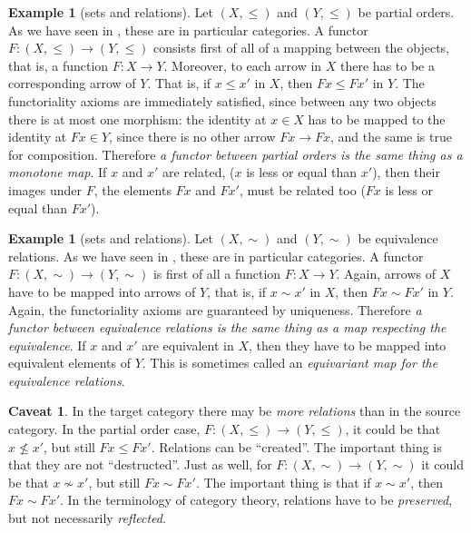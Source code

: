 \documentclass[a4paper,11pt,oneside]{scrbook}
\numberwithin{equation}{section}
\theoremstyle{plain}
\theoremstyle{definition}
\newtheorem{eg}[thm]{Example}
\newtheorem*{caveat}{Caveat}
\DeclareMathOperator{\1}{\mathbbm{1}}
\DeclareMathOperator{\2}{\mathbbm{2}}
\begin{document}
\begin{eg}[sets and relations]
 Let $(X,\le)$ and $(Y,\le)$ be partial orders. As we have seen in , these are in particular categories. A functor $F:(X,\le)\to (Y,\le)$ consists first of all of a mapping between the objects, that is, a function $F:X\to Y$. Moreover, to each arrow in $X$ there has to be a corresponding arrow of $Y$. That is, if $x\le x'$ in $X$, then $Fx \le Fx'$ in $Y$. The functoriality axioms are immediately satisfied, since between any two objects there is at most one morphism: the identity at $x\in X$ has to be mapped to the identity at $Fx\in Y$, since there is no other arrow $Fx\to Fx$, and the same is true for composition. 
 Therefore \emph{a functor between partial orders is the same thing as a monotone map}. If $x$ and $x'$ are related, ($x$ is less or equal than $x'$), then their images under $F$, the elements $Fx$ and $Fx'$, must be related too ($Fx$ is less or equal than $Fx'$). 
\end{eg}

\begin{eg}[sets and relations]\label{equequ}
 Let $(X,\sim)$ and $(Y,\sim)$ be equivalence relations. As we have seen in , these are in particular categories. A functor $F:(X,\sim)\to(Y,\sim)$ is first of all a function $F:X\to Y$. Again, arrows of $X$ have to be mapped into arrows of $Y$, that is, if $x\sim x'$ in $X$, then $Fx \sim Fx'$ in $Y$. Again, the functoriality axioms are guaranteed by uniqueness.
 Therefore \emph{a functor between equivalence relations is the same thing as a map respecting the equivalence}.
 If $x$ and $x'$ are equivalent in $X$, then they have to be mapped into equivalent elements of $Y$. This is sometimes called an \emph{equivariant map for the equivalence relations}. 
\end{eg}

\begin{caveat}
 In the target category there may be \emph{more relations} than in the source category. In the partial order case, $F:(X,\le)\to (Y,\le)$, it could be that $x\nleq x'$, but still $Fx \leq Fx'$. Relations can be ``created''. The important thing is that they are not ``destructed''.
 Just as well, for $F:(X,\sim)\to(Y,\sim)$ it could be that $x\nsim x'$, but still $Fx \sim Fx'$. The important thing is that if $x\sim x'$, then $Fx \sim Fx'$.
 In the terminology of category theory, relations have to be \emph{preserved}, but not necessarily \emph{reflected}. 
\end{caveat}
\end{document}
